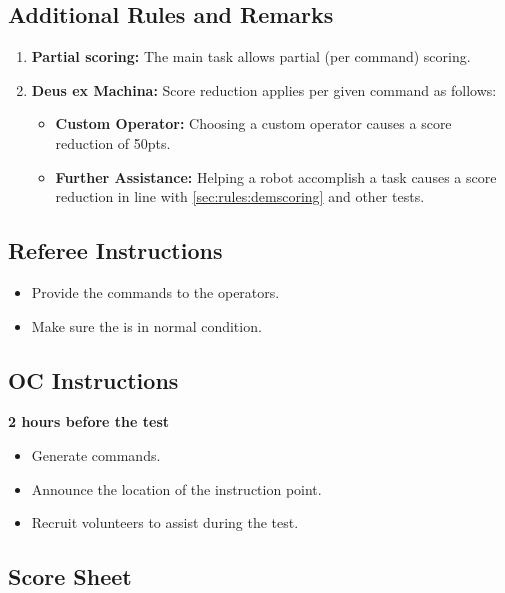 %
%
\subsection*{Additional Rules and Remarks}
\begin{enumerate}[nosep]
	\item \textbf{Partial scoring:} The main task allows partial (per command) scoring.
		
	\item \textbf{Deus ex Machina:} Score reduction applies per given command as follows:
	\begin{itemize}[nosep]
	\item \textbf{Custom Operator:} Choosing a custom operator causes a score reduction of 50pts.
	\item \textbf{Further Assistance:} Helping a robot accomplish a task causes a score reduction in line with \ref{sec:rules:demscoring} and other \SONE{} tests.
	\end{itemize}
\end{enumerate}


\subsection*{Referee Instructions}
\begin{itemize}[nosep]
	\item Provide the commands to the operators.
	\item Make sure the \Arena{} is in normal condition.
\end{itemize}


\subsection*{OC Instructions}
\textbf{2 hours before the test}
\begin{itemize}[nosep]
 	\item Generate commands.
	\item Announce the location of the instruction point.
	\item Recruit volunteers to assist during the test.
\end{itemize}


\subsection*{Score Sheet}


